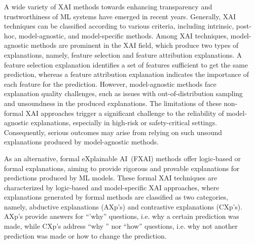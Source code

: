 A wide variety of XAI methods towards enhancing transparency and trustworthiness of ML systems
have emerged in recent years.
%
Generally, XAI techniques can be classified according to various criteria, including intrinsic, 
post-hoc, model-agnostic, and model-specific methods.
%
%
Among XAI techniques, model-agnostic methods are prominent in the XAI field,
which produce two types of explanations, namely, feature selection and
feature attribution explanations.
%
A feature selection explanation identifies a set of features sufficient to
get the same prediction, 
whereas a feature attribution explanation indicates the importance of each feature for the prediction.
%
However, model-agnostic methods face explanation quality challenges, such as issues with 
out-of-distribution sampling and unsoundness in the produced explanations.
%
The limitations of these non-formal XAI approaches trigger a significant challenge 
to the reliability of model-agnostic explanations, especially in high-risk or 
safety-critical settings.
%
Consequently, serious outcomes may arise from relying on such unsound
explanations produced by model-agnostic methods.

As an alternative, formal eXplainable AI~(FXAI) methods offer logic-based or formal explanations,
aiming to provide rigorous and provable explanations for predictions produced by ML models.
%
These formal XAI techniques are characterized by logic-based and model-specific XAI approaches,
where explanations generated by formal methods are classified as two categories, namely, abductive explanations (AXp's) and
contrastive explanations (CXp's).
%
AXp's provide answers for ``'why'' questions, i.e. why a certain prediction was made, 
while CXp's address ``why '' nor ``how'' questions,
i.e. why not another prediction was made or
how to change the prediction.

